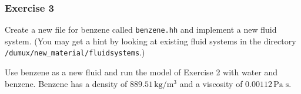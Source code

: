 \subsubsection{Exercise 3}
Create a new file for benzene called \texttt{benzene.hh} and implement
a new fluid system. (You may get a hint by looking at existing fluid 
systems in the directory \verb+/dumux/new_material/fluidsystems+.)

Use benzene as a new fluid and run the model of Exercise 2 with water
and benzene. Benzene has a density of $889.51 \, \text{kg} / \text{m}^3$
and a viscosity of $0.00112 \, \text{Pa} \; \text{s}$. 

